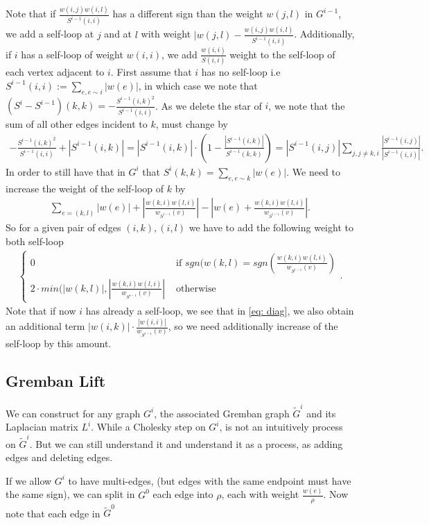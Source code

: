Note that if $\frac{w(i,j) w(i,l)}{ S^{i-1}(i,i)}$ has a different sign than the weight $w(j,l)$ in $G^{i-1}$, we add a self-loop at $j$ and at $l$ with weight $|w(j,l)-\frac{w(i,j) w(i,l)}{ S^{i-1}(i,i)}$. Additionally, if $i$ has a self-loop of weight $w(i,i)$, we add  $\frac{w(i,i)}{S(i,i)}$ weight to the self-loop of each vertex adjacent to $i$.  First assume that  $i$ has no self-loop i.e $S^{i-1}(i,i):=  \sum_{e, e\sim i} |w(e)|$, in which case we note that $\left(S^{i}-S^{i-1}\right)(k,k)= - \frac{S^{i-1}(i,k)^2}{S^{i-1}(i,i)}$. As we delete the star of $i$, we note that the sum of all other edges incident to $k$, must change by 
\begin{align}
\label{eq: diag}
    - \frac{S^{i-1}(i,k)^2}{S^{i-1}(i,i)} + |S^{i-1}(i,k)|= 
    |S^{i-1}(i,k)| \cdot (1- \frac{|S^{i-1}(i,k)|}{S^{i-1}(k,k)})= 
   |S^{i-1}(i,j)| \sum_{j, j\neq k,i} \frac{|S^{i-1}(i,j)|}{|S^{i-1}(i,i)|}.
\end{align}
In order to still have that in $G^{i}$ that $S^{i}(k,k)= \sum_{e,e\sim k} |w(e)|$. We need to increase the weight of the self-loop  of $k$ by 
\begin{align*}
    \sum_{e=(k,l)} |w(e)| + |\frac{w(k,i) w(l,i)}{w_{S^{i-1}}(v)}|- |w(e)+ \frac{w(k,i) w(l,i)}{w_{S^{i-1}}(v)}|.
\end{align*}
So for a given pair of edges $(i,k), (i,l)$ we have to add the following weight to both self-loop 
\begin{align*}
    \begin{cases}
        0 & \text{ if } sgn(w(k,l)= sgn(\frac{w(k,i) w(l,i)}{w_{S^{i-1}}(v)}) \\
        2 \cdot min(|w(k,l)|, |\frac{w(k,i) w(l,i)}{w_{S^{i-1}}(v)}| & \text{ otherwise}
    \end{cases}.
\end{align*}
Note that if now $i$ has already a self-loop, we see that in \ref{eq: diag}, we also obtain an additional 
term $|w(i,k)| \cdot \frac{|w(i,i)|}{w_{S^{i-1}}(v)}$, so we need additionally increase of the self-loop by this amount. 
\subsection{Gremban Lift}
We can construct for any graph $G^{i}$, the associated Gremban graph $\tilde{G}^{i}$ and its Laplacian matrix $L^{i}$. While a Cholesky step on $G^{i}$, is not an intuitively process on $\tilde{G}^{i}$. But we can still understand it and understand it as a process, as adding edges and deleting edges. 

If we allow $G^{i}$ to have multi-edges, (but edges with the same endpoint must have the same sign), we can split in $G^{0}$ each edge into $\rho$, each with weight  $\frac{w(e)}{\rho}$. Now note that each edge in $\tilde{G}^{0}$

